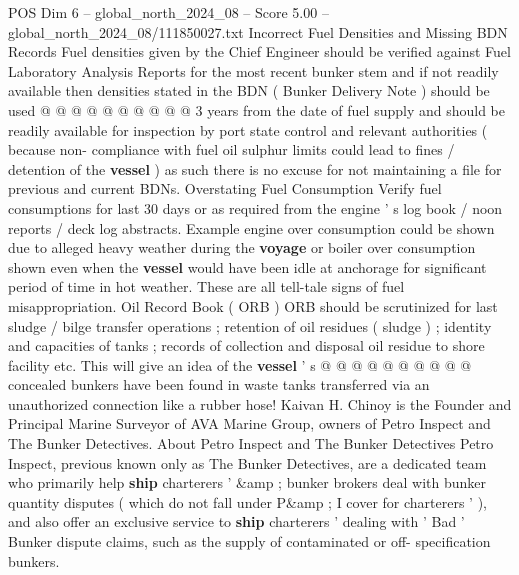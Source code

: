 \begin{textsample}{POS Dim 6 – global\_north\_2024\_08 – Score 5.00 – global\_north\_2024\_08/111850027.txt}
Incorrect Fuel Densities and Missing BDN Records Fuel densities given by the Chief Engineer should be verified against Fuel Laboratory Analysis Reports for the most recent bunker stem and if not readily available then densities stated in the BDN ( Bunker Delivery Note ) should be used @ @ @ @ @ @ @ @ @ @ 3 years from the date of fuel supply and should be readily available for inspection by port state control and relevant authorities ( because non- compliance with fuel oil sulphur limits could lead to fines / detention of the \textbf{vessel} ) as such there is no excuse for not maintaining a file for previous and current BDNs.
Overstating Fuel Consumption Verify fuel consumptions for last 30 days or as required from the engine ' s log book / noon reports / deck log abstracts.
Example engine over consumption could be shown due to alleged heavy weather during the \textbf{voyage} or boiler over consumption shown even when the \textbf{vessel} would have been idle at anchorage for significant period of time in hot weather.
These are all tell-tale signs of fuel misappropriation.
Oil Record Book ( ORB ) ORB should be scrutinized for last sludge / bilge transfer operations ; retention of oil residues ( sludge ) ; identity and capacities of tanks ; records of collection and disposal oil residue to shore facility etc.
This will give an idea of the \textbf{vessel} ' s @ @ @ @ @ @ @ @ @ @ concealed bunkers have been found in waste tanks transferred via an unauthorized connection like a rubber hose!
Kaivan H.
Chinoy is the Founder and Principal Marine Surveyor of AVA Marine Group, owners of Petro Inspect and The Bunker Detectives.
About Petro Inspect and The Bunker Detectives Petro Inspect, previous known only as The Bunker Detectives, are a dedicated team who primarily help \textbf{ship} charterers ' \&amp ; bunker brokers deal with bunker quantity disputes ( which do not fall under P\&amp ; I cover for charterers ' ), and also offer an exclusive service to \textbf{ship} charterers ' dealing with ' Bad ' Bunker dispute claims, such as the supply of contaminated or off- specification bunkers.

\end{textsample}
